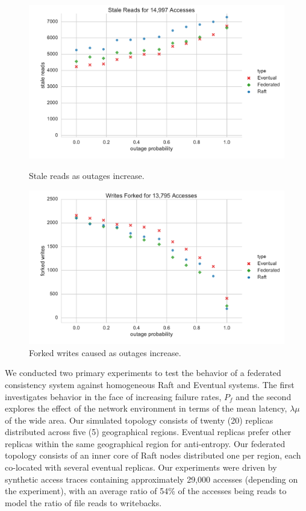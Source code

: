 \documentclass[10pt,conference,letterpaper]{IEEEtran}
\begin{document}
\begin{figure}[t]
    \centering
      \includegraphics[width=\linewidth]{figures/outages/stale_reads}
      \caption{Stale reads as outages increase.}\label{fig:outages_stale_reads}
    \endminipage
      \includegraphics[width=\linewidth]{figures/outages/forked_writes}
      \caption{Forked writes caused as outages increase.}\label{fig:outages_forked_writes}
    \endminipage\hfill
\end{figure}

We conducted two primary experiments to test the behavior of a federated consistency
system against homogeneous Raft and Eventual systems.
The first investigates behavior in the face of increasing failure rates, $P_f$ and the
second explores the effect of the network environment in terms of the mean latency,
$\lambda{\mu}$ of the wide area.
Our simulated topology consists of twenty (20) replicas distributed across five (5)
geographical regions.
Eventual replicas prefer other replicas within the same geographical region for
anti-entropy.
Our federated topology consists of an inner core of Raft nodes distributed one per region,
each co-located with several eventual replicas.
Our experiments were driven by synthetic access traces containing approximately 29,000
accesses (depending on the experiment), with an average ratio of 54\% of the accesses
being reads to model the ratio of file reads to writebacks.
\end{document}
